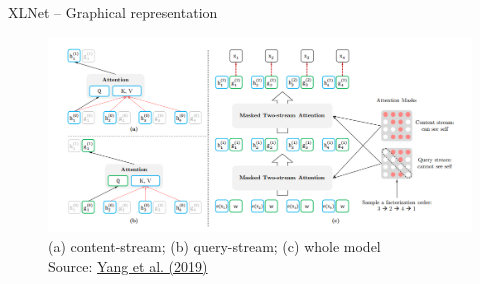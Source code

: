 
\begin{frame}{XLNet -- Graphical representation}

\vfill

	\begin{figure}
		\centering
		\includegraphics[width = 12cm]{figure/xlnet}\\ 
		{\tiny (a) content-stream; (b) query-stream; (c) whole model\\\footnotesize Source: \href{https://papers.nips.cc/paper/8812-xlnet-generalized-autoregressive-pretraining-for-language-understanding.pdf}{Yang et al. (2019)}}
	\end{figure}
	
\vfill

\end{frame}


